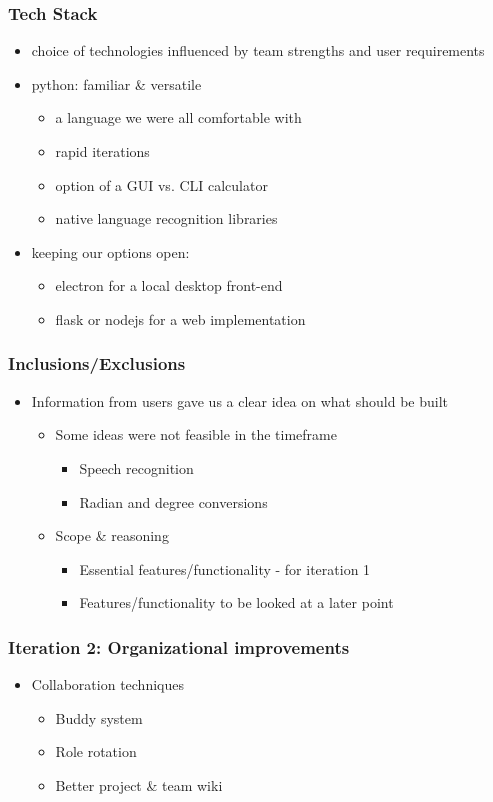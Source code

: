 \documentclass{beamer}
\begin{document}
\begin{frame}
\frametitle{Tech Stack}
 \begin{itemize}
  \item choice of technologies influenced by team strengths and user requirements
  \item python: familiar \& versatile
   \begin{itemize}
    \item a language we were all comfortable with
    \item rapid iterations
    \item option of a GUI vs. CLI calculator
    \item native language recognition libraries
   \end{itemize}
  \item keeping our options open:
   \begin{itemize}
    \item electron for a local desktop front-end
    \item flask or nodejs for a web implementation
   \end{itemize}
  \end{itemize}
\end{frame}

\begin{frame}
\frametitle{Inclusions/Exclusions}
\begin{itemize}
 \item Information from users gave us a clear idea on what should be built
  \begin{itemize}
  \item Some ideas were not feasible in the timeframe
  \begin{itemize}
    \item Speech recognition
    \item Radian and degree conversions
  \end{itemize}
  \item Scope \& reasoning
    \begin{itemize}
    \item Essential features/functionality - for iteration 1
    \item Features/functionality to be looked at a later point
  \end{itemize}
  \end{itemize}
  \end{itemize}
\end{frame}

\begin{frame}
\frametitle{Iteration 2: Organizational improvements}
\begin{itemize}
 \item Collaboration techniques
  \begin{itemize}
   \item Buddy system
   \item Role rotation
   \item Better project \& team wiki
  \end{itemize}
\end{itemize}
\end{frame}
\end{document}
